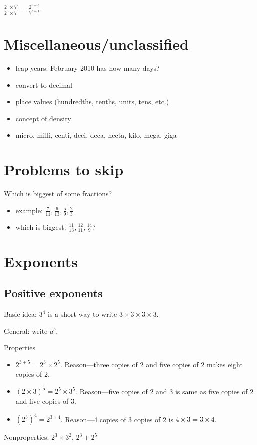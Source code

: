 \documentclass[fullpage,twocolumn]{article}
\begin{document}
$\frac{2^5 \times 7^2}{2^3 \times 7^3} = \frac{2^{5-3}}{7^{3-1}}$.

\section{Miscellaneous/unclassified}
\begin{itemize}
\item leap years: February  2010 has how many days?
\item convert to decimal
\item place values (hundredths, tenths, units, tens, etc.)
\item concept of density
\item micro, milli, centi, deci, deca, hecta, kilo, mega, giga
\end{itemize}



\section{Problems to skip}
Which is biggest of some fractions?
\begin{itemize}
\item example: $\frac{7}{11}, \frac{6}{13}, \frac{5}{9}, \frac{2}{3}$
\item which is biggest: $\frac{11}{13}, \frac{12}{11}, \frac{14}{9}$?
\end{itemize}


\section{Exponents}
\subsection*{Positive exponents}

Basic idea: $3^4$ is a short way to write $3 \times 3 \times 3 \times 3$.

General: write $a^b$.

Properties
\begin{itemize}
\item $2^{3+5} = 2^3 \times 2^5$. Reason---three copies of 2 and five copies of 2 makes eight copies of 2.
\item $(2 \times 3)^5 = 2^5 \times 3^5$. Reason---five copies of 2 and 3 is same as five copies of 2 and five copies of 3.
\item $(2^3)^4 = 2^{3 \times 4}$. Reason---4 copies of 3 copies of 2 is $4 \times 3 = 3 \times 4$.
\end{itemize}
Nonproperties: $2^3 \times 3^2$, $2^3 + 2^5$
\end{document}
